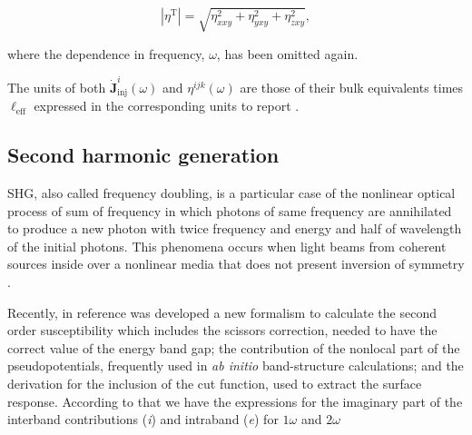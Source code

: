 \documentclass[aps,pra,11pt,tightenlines,showpacs,superscriptaddress,groupedaddress]{revtex4-1}
\begin{document}
\begin{equation}
    \left|{\eta^{\text{T}}}\right| = \sqrt{ \eta_{xxy}^{2} +
    \eta_{yxy}^{2} + \eta_{zxy}^{2} },
\end{equation}

\noindent where the dependence in frequency, $\omega$, has been omitted again.

The units of both $\mathbf{\dot{J}}^{i}_{\text{inj}}(\omega)$ and $\eta^{ijk}
(\omega)$  are those of their bulk equivalents times $\ell_{\text{eff}}$
expressed in the corresponding units to report \cite{cabellos2011optical}.



    \subsection{Second harmonic generation}

SHG, also called frequency doubling, is a particular case of the nonlinear
optical process of sum of frequency in which photons of same frequency are
annihilated to produce a new photon with twice frequency and energy and half of
wavelength of the initial photons. This phenomena occurs when light beams from
coherent sources inside over a nonlinear media that does not present inversion
of symmetry \cite{bloembergen1962light,anderson2015theory,salazar2014molecular,
sipe2000second}.

Recently, in reference \cite{anderson2015theory} was developed a new
formalism to calculate the second order susceptibility which includes the
scissors correction, needed to have the correct value of the energy band gap;
the contribution of the nonlocal part of the pseudopotentials, frequently used
in \emph{ab initio} band-structure calculations; and the derivation for the inclusion
of the cut function, used to extract the surface response. According to that we
have the expressions for the imaginary part of the interband contributions
(\emph{i}) and intraband (\emph{e}) for $1\omega$ and $2\omega$
\end{document}
